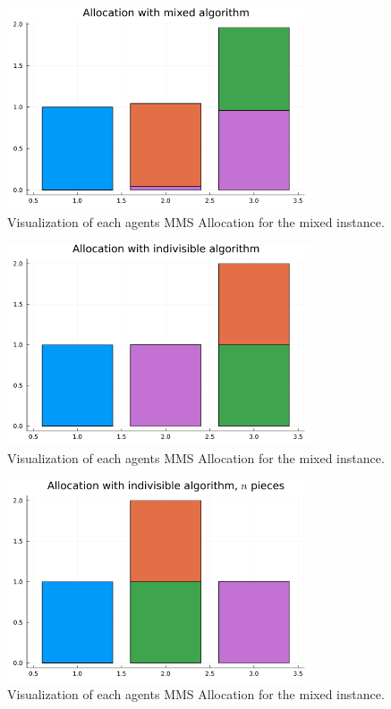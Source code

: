 \begin{figure}
    \centering
    \includegraphics[width=0.8\textwidth]{assets/plots/visualize_mixed_allocation.png}
    \caption{Visualization of each agents MMS Allocation for the mixed instance.}
    \label{fig:visualize_mixed_allocation}
\end{figure}


\begin{figure}
    \centering
    \includegraphics[width=0.8\textwidth]{assets/plots/visualize_indivisible_allocation.png}
    \caption{Visualization of each agents MMS Allocation for the mixed instance.}
    \label{fig:visualize_indivisible_allocation}
\end{figure}

\begin{figure}
    \centering
    \includegraphics[width=0.8\textwidth]{assets/plots/visualize_indivisible_n_pieces_allocation.png}
    \caption{Visualization of each agents MMS Allocation for the mixed instance.}
    \label{fig:visualize_indivisible_n_pieces_allocation}
\end{figure}